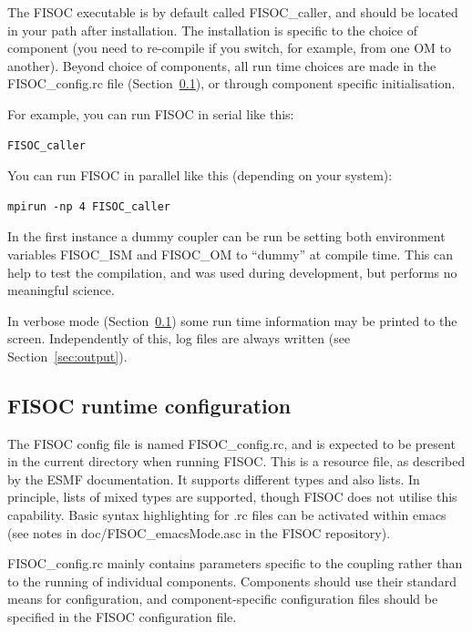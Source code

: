 \documentclass[11pt]{article}
\begin{document}
The FISOC executable is by default called FISOC\_caller, and should be located in your 
path after installation. 
The installation is specific to the choice of component (you need to re-compile if you switch, for 
example, from one OM to another).  
Beyond choice of components, all run time choices are made in the FISOC\_config.rc file
(Section~\ref{sec:config}), 
or through component specific initialisation.

For example, you can run FISOC in serial like this:
\begin{lstlisting}
FISOC_caller
\end{lstlisting}
You can run FISOC in parallel like this (depending on your system):
\begin{lstlisting}
mpirun -np 4 FISOC_caller
\end{lstlisting}

In the first instance a dummy coupler can be run be setting both environment variables FISOC\_ISM and 
FISOC\_OM to ``dummy'' at compile time.  This can help to test the compilation, and was used during development, 
but performs no meaningful science.  

In verbose mode (Section~\ref{sec:config}) some run time information may be printed to the screen.  
Independently of this, log files are always written (see Section~\ref{sec:output}). 









\subsection{FISOC runtime configuration}
\label{sec:config}

The FISOC config file is named FISOC\_config.rc, and is expected to be present 
in the current directory when running FISOC.  
This is a resource file, as described by the 
ESMF documentation.  It supports different types and also lists. 
In principle, lists of mixed types are supported, though FISOC does not utilise this capability.
Basic syntax highlighting for .rc files can be activated within emacs 
(see notes in doc/FISOC\_emacsMode.asc in the FISOC repository).

FISOC\_config.rc mainly contains parameters specific to the coupling rather than to the running of 
individual components.  
Components should use their standard means for configuration, and component-specific configuration files 
should be specified in the FISOC configuration file.
\end{document}

